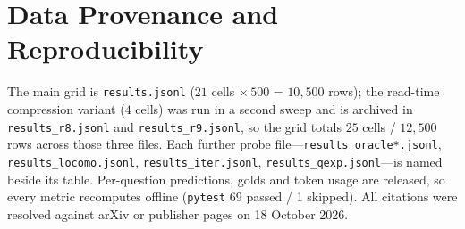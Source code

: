 \documentclass{article} %
\begin{document}
\section{Data Provenance and Reproducibility}
\label{app:provenance}
The main grid is \texttt{results.jsonl} ($21$ cells $\times\,500$ = $10{,}500$ rows); the
read-time compression variant ($4$ cells) was run in a second sweep and is archived in
\texttt{results\_r8.jsonl} and \texttt{results\_r9.jsonl}, so the grid totals $25$ cells /
$12{,}500$ rows across those three files. Each further probe file---\texttt{results\_oracle*.jsonl},
\texttt{results\_locomo.jsonl}, \texttt{results\_iter.jsonl}, \texttt{results\_qexp.jsonl}---is
named beside its table.
Per-question predictions, golds and token usage are released, so every metric recomputes
offline (\texttt{pytest} 69 passed / 1 skipped). All citations were resolved against arXiv or
publisher pages on 18 October 2026.
\end{document}
